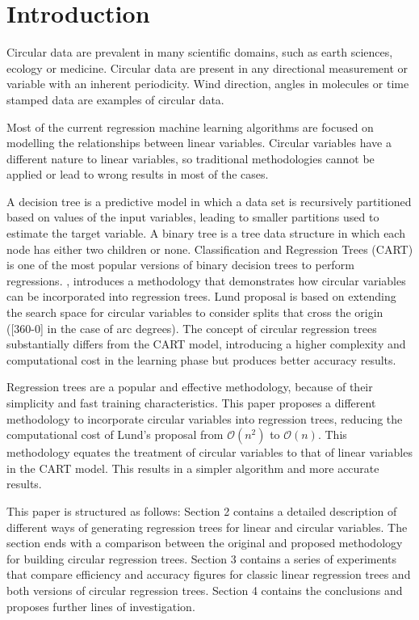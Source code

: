 \documentclass[times,twocolumn,final,authoryear]{elsarticle}
\begin{document}

\section{Introduction}
\label{intro}
Circular data are prevalent in many scientific domains, such as earth sciences, ecology or medicine. Circular data are present in any directional measurement or variable with an inherent periodicity. Wind direction, angles in molecules or time stamped data are examples of circular data.

Most of the current regression machine learning algorithms are focused on modelling the relationships between linear variables. Circular variables have a different nature to linear variables, so traditional methodologies cannot be applied or lead to wrong results in most of the cases.

A decision tree is a predictive model in which a data set is recursively partitioned based on values of the input variables, leading to smaller partitions used to estimate the target variable. A binary tree is a tree data structure in which each node has either two children or none. Classification and Regression Trees (CART) \citep{Breimanetal1984} is one of the most popular versions of binary decision trees to perform regressions. \citep{Lund2002}, introduces a methodology that demonstrates how circular variables can be incorporated into regression trees. Lund proposal is based on extending the search space for circular variables to consider splits that cross the origin ([360-0] in the case of arc degrees). The concept of circular regression trees substantially differs from the CART model, introducing a higher complexity and computational cost in the learning phase but produces better accuracy results. 

Regression trees are a popular and effective methodology, because of their simplicity and fast training characteristics. This paper proposes a different methodology to incorporate circular variables into regression trees, reducing the computational cost of Lund's proposal from $\mathcal{O}(n^2)$ to $\mathcal{O}(n)$. This methodology equates the treatment of circular variables to that of linear variables in the CART model. This results in a simpler algorithm and more accurate results.

This paper is structured as follows: Section 2 contains a detailed description of different ways of generating regression trees for linear and circular variables. The section ends with a comparison between the original and proposed methodology for building circular regression trees. Section 3 contains a series of experiments that compare efficiency and accuracy figures for classic linear regression trees and both versions of circular regression trees. Section 4 contains the conclusions and proposes further lines of investigation.
\end{document}
